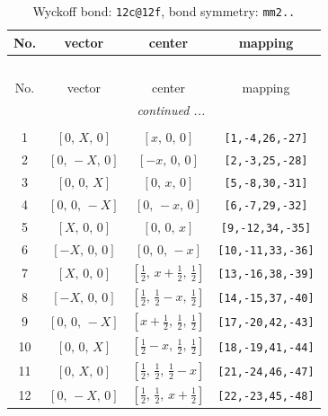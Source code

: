 \documentclass[fleqn,8pt]{jsarticle}
\begin{document}
\renewcommand{\arraystretch}{1.2}
\begin{longtable}{cccc}
\caption{Wyckoff bond: {\tt 12c@12f}, bond symmetry: {\tt mm2..}}
 \\
 \hline \hline
No. & vector & center & mapping \\ \hline \endfirsthead

\multicolumn{3}{l}{\tablename\ \thetable{}} \\
 \hline \hline
No. & vector & center & mapping \\ \hline \endhead

 \hline \hline
\multicolumn{3}{r}{\footnotesize\it continued ...} \\ \endfoot

 \hline \hline
\multicolumn{3}{r}{} \\ \endlastfoot

1 & $\left[ 0,\, X,\, 0 \right]$ & $\left[ x,\, 0,\, 0 \right]$ & {\tt [1,-4,26,-27]} \\ \hline
2 & $\left[ 0,\, - X,\, 0 \right]$ & $\left[ - x,\, 0,\, 0 \right]$ & {\tt [2,-3,25,-28]} \\ \hline
3 & $\left[ 0,\, 0,\, X \right]$ & $\left[ 0,\, x,\, 0 \right]$ & {\tt [5,-8,30,-31]} \\ \hline
4 & $\left[ 0,\, 0,\, - X \right]$ & $\left[ 0,\, - x,\, 0 \right]$ & {\tt [6,-7,29,-32]} \\ \hline
5 & $\left[ X,\, 0,\, 0 \right]$ & $\left[ 0,\, 0,\, x \right]$ & {\tt [9,-12,34,-35]} \\ \hline
6 & $\left[ - X,\, 0,\, 0 \right]$ & $\left[ 0,\, 0,\, - x \right]$ & {\tt [10,-11,33,-36]} \\ \hline
7 & $\left[ X,\, 0,\, 0 \right]$ & $\left[ \frac{1}{2},\, x + \frac{1}{2},\, \frac{1}{2} \right]$ & {\tt [13,-16,38,-39]} \\ \hline
8 & $\left[ - X,\, 0,\, 0 \right]$ & $\left[ \frac{1}{2},\, \frac{1}{2} - x,\, \frac{1}{2} \right]$ & {\tt [14,-15,37,-40]} \\ \hline
9 & $\left[ 0,\, 0,\, - X \right]$ & $\left[ x + \frac{1}{2},\, \frac{1}{2},\, \frac{1}{2} \right]$ & {\tt [17,-20,42,-43]} \\ \hline
10 & $\left[ 0,\, 0,\, X \right]$ & $\left[ \frac{1}{2} - x,\, \frac{1}{2},\, \frac{1}{2} \right]$ & {\tt [18,-19,41,-44]} \\ \hline
11 & $\left[ 0,\, X,\, 0 \right]$ & $\left[ \frac{1}{2},\, \frac{1}{2},\, \frac{1}{2} - x \right]$ & {\tt [21,-24,46,-47]} \\ \hline
12 & $\left[ 0,\, - X,\, 0 \right]$ & $\left[ \frac{1}{2},\, \frac{1}{2},\, x + \frac{1}{2} \right]$ & {\tt [22,-23,45,-48]} \\
\end{longtable}
\end{document}
